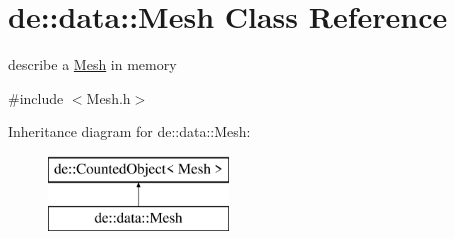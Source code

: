 \hypertarget{classde_1_1data_1_1_mesh}{
\section{de\-:\-:data\-:\-:\-Mesh \-Class \-Reference}
\label{classde_1_1data_1_1_mesh}
}


describe a \hyperlink{classde_1_1data_1_1_mesh}{\-Mesh} in memory  




{\ttfamily \#include $<$\-Mesh.\-h$>$}

\-Inheritance diagram for de\-:\-:data\-:\-:\-Mesh\-:\begin{figure}[H]
\begin{center}
\leavevmode
\includegraphics[height=2.000000cm]{classde_1_1data_1_1_mesh}
\end{center}
\end{figure}
